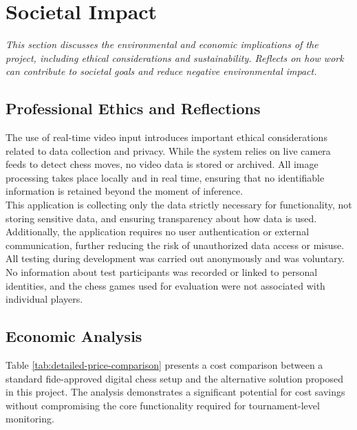 \chapter{Societal Impact}

\begin{center}
    \textit{This section discusses the environmental and economic implications of the project, including ethical considerations and sustainability. Reflects on how work can contribute to societal goals and reduce negative environmental impact.}
\end{center}

\section{Professional Ethics and Reflections}
The use of real-time video input introduces important ethical considerations related to data collection and privacy. While the system relies on live camera feeds to detect chess moves, no video data is stored or archived. All image processing takes place locally and in real time, ensuring that no identifiable information is retained beyond the moment of inference. \\

This application is collecting only the data strictly necessary for functionality, not storing sensitive data, and ensuring transparency about how data is used. Additionally, the application requires no user authentication or external communication, further reducing the risk of unauthorized data access or misuse. \\

All testing during development was carried out anonymously and was voluntary. No information about test participants was recorded or linked to personal identities, and the chess games used for evaluation were not associated with individual players. \\

\section{Economic Analysis}
Table \ref{tab:detailed-price-comparison} presents a cost comparison between a standard \gls{fide}-approved digital chess setup and the alternative solution proposed in this project. The analysis demonstrates a significant potential for cost savings without compromising the core functionality required for tournament-level monitoring. \\

